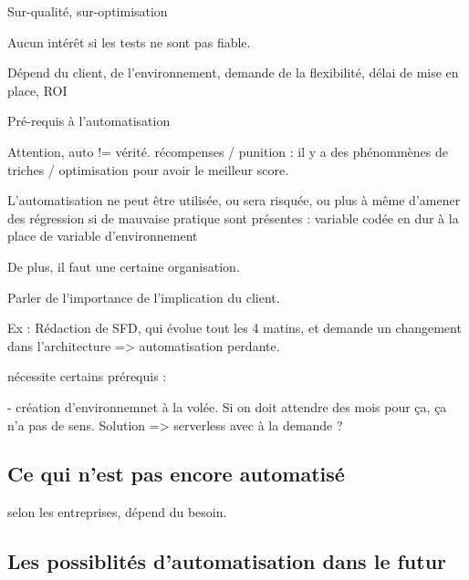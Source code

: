 
Sur-qualité, sur-optimisation

Aucun intérêt si les tests ne sont pas fiable.

Dépend du client, de l'environnement, demande de la flexibilité, délai de mise en place, ROI

Pré-requis à l'automatisation

Attention, auto != vérité. récompenses / punition : il y a des phénommènes de triches / optimisation pour avoir le meilleur score.

L'automatisation ne peut être utilisée, ou sera risquée, ou plus à même d'amener des régression si de mauvaise pratique sont présentes : variable codée en dur à la place de variable d'environnement

De plus, il faut une certaine organisation.

Parler de l'importance de l'implication du client. 

Ex :  Rédaction de SFD, qui évolue tout les 4 matins, et demande un changement dans l'architecture => automatisation perdante.

nécessite certains prérequis : 

- création d'environnemnet à la volée. Si on doit attendre des mois pour ça, ça n'a pas de sens. Solution => serverless avec à la demande ? 

\subsection*{Ce qui n'est pas encore automatisé}


selon les entreprises, dépend du besoin.


\subsection*{Les possiblités d'automatisation dans le futur}

